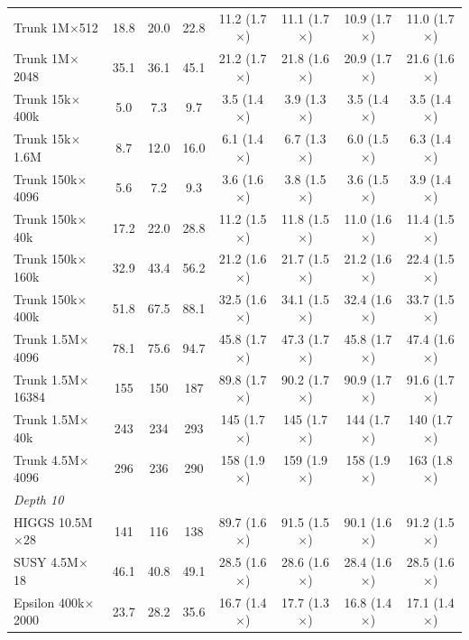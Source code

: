 \begin{table}[p]
\begin{tabular}{l|ccc|cccc}
        Trunk 1M$\times$512 & 18.8 & 20.0 & 22.8 & 11.2 (1.7$\times$) & 11.1 (1.7$\times$) & 10.9 (1.7$\times$) & 11.0 (1.7$\times$) \\
        Trunk 1M$\times$2048 & 35.1 & 36.1 & 45.1 & 21.2 (1.7$\times$) & 21.8 (1.6$\times$) & 20.9 (1.7$\times$) & 21.6 (1.6$\times$) \\
        Trunk 15k$\times$400k & 5.0 & 7.3 & 9.7 & 3.5 (1.4$\times$) & 3.9 (1.3$\times$) & 3.5 (1.4$\times$) & 3.5 (1.4$\times$) \\
        Trunk 15k$\times$1.6M & 8.7 & 12.0 & 16.0 & 6.1 (1.4$\times$) & 6.7 (1.3$\times$) & 6.0 (1.5$\times$) & 6.3 (1.4$\times$) \\
        Trunk 150k$\times$4096 & 5.6 & 7.2 & 9.3 & 3.6 (1.6$\times$) & 3.8 (1.5$\times$) & 3.6 (1.5$\times$) & 3.9 (1.4$\times$) \\
        Trunk 150k$\times$40k & 17.2 & 22.0 & 28.8 & 11.2 (1.5$\times$) & 11.8 (1.5$\times$) & 11.0 (1.6$\times$) & 11.4 (1.5$\times$) \\
        Trunk 150k$\times$160k & 32.9 & 43.4 & 56.2 & 21.2 (1.6$\times$) & 21.7 (1.5$\times$) & 21.2 (1.6$\times$) & 22.4 (1.5$\times$) \\
        Trunk 150k$\times$400k & 51.8 & 67.5 & 88.1 & 32.5 (1.6$\times$) & 34.1 (1.5$\times$) & 32.4 (1.6$\times$) & 33.7 (1.5$\times$) \\
        Trunk 1.5M$\times$4096 & 78.1 & 75.6 & 94.7 & 45.8 (1.7$\times$) & 47.3 (1.7$\times$) & 45.8 (1.7$\times$) & 47.4 (1.6$\times$) \\
        Trunk 1.5M$\times$16384 & 155 & 150 & 187 & 89.8 (1.7$\times$) & 90.2 (1.7$\times$) & 90.9 (1.7$\times$) & 91.6 (1.7$\times$) \\
        Trunk 1.5M$\times$40k & 243 & 234 & 293 & 145 (1.7$\times$) & 145 (1.7$\times$) & 144 (1.7$\times$) & 140 (1.7$\times$) \\
        Trunk 4.5M$\times$4096 & 296 & 236 & 290 & 158 (1.9$\times$) & 159 (1.9$\times$) & 158 (1.9$\times$) & 163 (1.8$\times$) \\
        \hline
        \multicolumn{8}{l}{\textit{Depth 10}} \\
        HIGGS 10.5M$\times$28 & 141 & 116 & 138 & 89.7 (1.6$\times$) & 91.5 (1.5$\times$) & 90.1 (1.6$\times$) & 91.2 (1.5$\times$) \\
        SUSY 4.5M$\times$18 & 46.1 & 40.8 & 49.1 & 28.5 (1.6$\times$) & 28.6 (1.6$\times$) & 28.4 (1.6$\times$) & 28.5 (1.6$\times$) \\
        Epsilon 400k$\times$2000 & 23.7 & 28.2 & 35.6 & 16.7 (1.4$\times$) & 17.7 (1.3$\times$) & 16.8 (1.4$\times$) & 17.1 (1.4$\times$) \\

\end{tabular}
\end{table}
